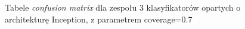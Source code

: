 \documentclass[polish,12pt]{aghthesis}
\begin{document}
\begin{figure}[H]%
    \begin{adjustbox}{minipage=1.0\paperwidth, pagecenter}
    \centering
    \qquad
    \end{adjustbox}
    \label{fig:inc-ens-3-0.7-matrices}
    \caption{Tabele \textit{confusion matrix} dla zespołu 3 klasyfikatorów opartych o architekturę Inception, z parametrem coverage=0.7}
\end{figure}
\end{document}
